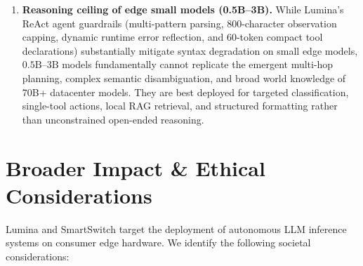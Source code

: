 \documentclass[11pt,a4paper]{article}
\begin{document}
\begin{enumerate}[leftmargin=*]
\item \textbf{Reasoning ceiling of edge small models (0.5B--3B).} While Lumina's ReAct agent guardrails (multi-pattern parsing, 800-character observation capping, dynamic runtime error reflection, and 60-token compact tool declarations) substantially mitigate syntax degradation on small edge models, $0.5\mathrm{B}$--$3\mathrm{B}$ models fundamentally cannot replicate the emergent multi-hop planning, complex semantic disambiguation, and broad world knowledge of 70B+ datacenter models. They are best deployed for targeted classification, single-tool actions, local RAG retrieval, and structured formatting rather than unconstrained open-ended reasoning.
\end{enumerate}

\section{Broader Impact \& Ethical Considerations}\label{sec:ethics}
Lumina and SmartSwitch target the deployment of autonomous LLM inference systems on consumer edge hardware. We identify the following societal considerations:
\end{document}
